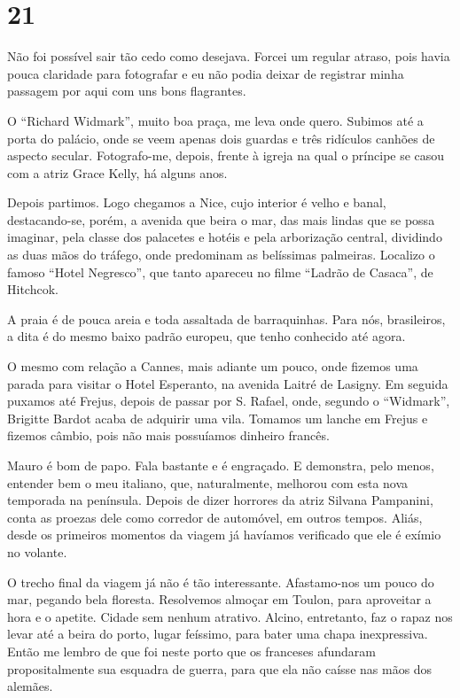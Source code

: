 \section*{21 \adfflatleafright {}}
Não foi possível sair tão cedo como desejava. Forcei um regular atraso, pois havia pouca claridade para fotografar e eu não podia deixar de registrar minha passagem por aqui com uns bons flagrantes.

O ``Richard Widmark'', muito boa praça, me leva onde quero. Subimos até a porta do palácio, onde se veem apenas dois guardas e três ridículos canhões de aspecto secular. Fotografo-me, depois, frente à igreja na qual o príncipe se casou com a atriz Grace Kelly, há alguns anos.

Depois partimos. Logo chegamos a Nice, cujo interior é velho e banal, destacando-se, porém, a avenida que beira o mar, das mais lindas que se possa imaginar, pela classe dos palacetes e hotéis e pela arborização central, dividindo as duas mãos do tráfego, onde predominam as belíssimas palmeiras. Localizo o famoso ``Hotel Negresco'', que tanto apareceu no filme ``Ladrão de Casaca'', de Hitchcok.

A praia é de pouca areia e toda assaltada de barraquinhas. Para nós, brasileiros, a dita é do mesmo baixo padrão europeu, que tenho conhecido até agora.

O mesmo com relação a Cannes, mais adiante um pouco, onde fizemos uma parada para visitar o Hotel Esperanto, na avenida Laitré de Lasigny. Em seguida puxamos até Frejus, depois de passar por S. Rafael, onde, segundo o ``Widmark'', Brigitte Bardot acaba de adquirir uma vila. Tomamos um lanche em Frejus e fizemos câmbio, pois não mais possuíamos dinheiro francês.

Mauro é bom de papo. Fala bastante e é engraçado. E demonstra, pelo menos, entender bem o meu italiano, que, naturalmente, melhorou com esta nova temporada na península. Depois de dizer horrores da atriz Silvana Pampanini, conta as proezas dele como corredor de automóvel, em outros tempos. Aliás, desde os primeiros momentos da viagem já havíamos verificado que ele é exímio no volante.

O trecho final da viagem já não é tão interessante. Afastamo-nos um pouco do mar, pegando bela floresta. Resolvemos almoçar em Toulon, para aproveitar a hora e o apetite. Cidade sem nenhum atrativo. Alcino, entretanto, faz o rapaz nos levar até a beira do porto, lugar feíssimo, para bater uma chapa inexpressiva. Então me lembro de que foi neste porto que os franceses afundaram propositalmente sua esquadra de guerra, para que ela não caísse nas mãos dos alemães.

